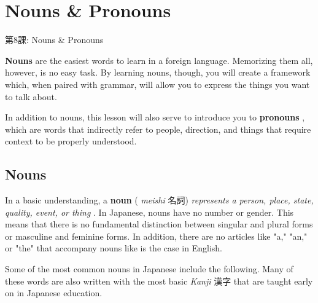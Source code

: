     
\chapter{Nouns \& Pronouns}

\begin{center}
\begin{Large}
第8課: Nouns \& Pronouns 
\end{Large}
\end{center}
 
\par{ \textbf{Nouns }are the easiest words to learn in a foreign language. Memorizing them all, however, is no easy task. By learning nouns, though, you will create a framework which, when paired with grammar, will allow you to express the things you want to talk about. }

\par{ In addition to nouns, this lesson will also serve to introduce you to \textbf{pronouns }, which are words that indirectly refer to people, direction, and things that require context to be properly understood. }
      
\section{Nouns}
 
\par{ In a basic understanding, a \textbf{noun }( \emph{meishi }名詞) \emph{represents a person, place, state, quality, event, or thing }. In Japanese, nouns have no number or gender. This means that there is no fundamental distinction between singular and plural forms or masculine and feminine forms. In addition, there are no articles like "a," "an," or "the" that accompany nouns like is the case in English.  }

\par{ Some of the most common nouns in Japanese include the following. Many of these words are also written with the most basic \emph{Kanji }漢字 that are taught early on in Japanese education. }

